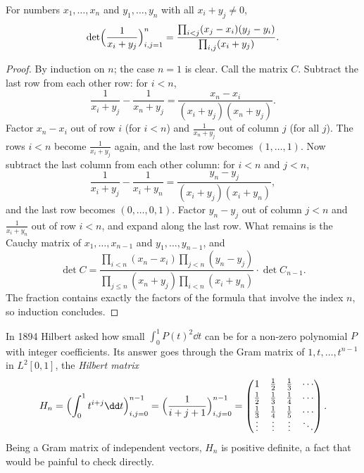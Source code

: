 \begin{theorem}[Cauchy, 1841]\label{linear:thm:cauchydet}
For numbers $x_1,\dots,x_n$ and $y_1,\dots,y_n$ with all $x_i+y_j\ne0$,
\[
\det\Bigl(\frac1{x_i+y_j}\Bigr)_{i,j=1}^n=\frac{\prod_{i<j}(x_j-x_i)(y_j-y_i)}{\prod_{i,j}(x_i+y_j)}.
\]
\end{theorem}
\begin{proof}
By induction on $n$; the case $n=1$ is clear. Call the matrix $C$. Subtract the last row from each other row: for $i<n$,
\[
\frac1{x_i+y_j}-\frac1{x_n+y_j}=\frac{x_n-x_i}{(x_i+y_j)(x_n+y_j)}.
\]
Factor $x_n-x_i$ out of row $i$ (for $i<n$) and $\frac1{x_n+y_j}$ out of column $j$ (for all $j$). The rows $i<n$ become
$\frac1{x_i+y_j}$ again, and the last row becomes $(1,\dots,1)$. Now subtract the last column from each other column:
for $i<n$ and $j<n$,
\[
\frac1{x_i+y_j}-\frac1{x_i+y_n}=\frac{y_n-y_j}{(x_i+y_j)(x_i+y_n)},
\]
and the last row becomes $(0,\dots,0,1)$. Factor $y_n-y_j$ out of column $j<n$ and $\frac1{x_i+y_n}$ out of row $i<n$,
and expand along the last row. What remains is the Cauchy matrix of $x_1,\dots,x_{n-1}$ and $y_1,\dots,y_{n-1}$, and
\[
\det C=\frac{\prod_{i<n}(x_n-x_i)\prod_{j<n}(y_n-y_j)}{\prod_{j\le n}(x_n+y_j)\prod_{i<n}(x_i+y_n)}\cdot\det C_{n-1}.
\]
The fraction contains exactly the factors of the formula that involve the index $n$, so induction concludes.
\end{proof}

In 1894 Hilbert asked how small $\int_0^1P(t)^2\dd t$ can be for a non-zero polynomial $P$ with integer coefficients. Its
answer goes through the Gram matrix of $1,t,\dots,t^{n-1}$ in $L^2[0,1]$, the \emph{Hilbert matrix}
\[
H_n=\Bigl(\int_0^1t^{i+j}\dd t\Bigr)_{i,j=0}^{n-1}=\Bigl(\frac1{i+j+1}\Bigr)_{i,j=0}^{n-1}
=\begin{pmatrix}1&\frac12&\frac13&\cdots\\[2pt]\frac12&\frac13&\frac14&\cdots\\[2pt]\frac13&\frac14&\frac15&\cdots\\[-2pt]
\vdots&\vdots&\vdots&\ddots\end{pmatrix}.
\]
Being a Gram matrix of independent vectors, $H_n$ is positive definite, a fact that would be painful to check directly.

